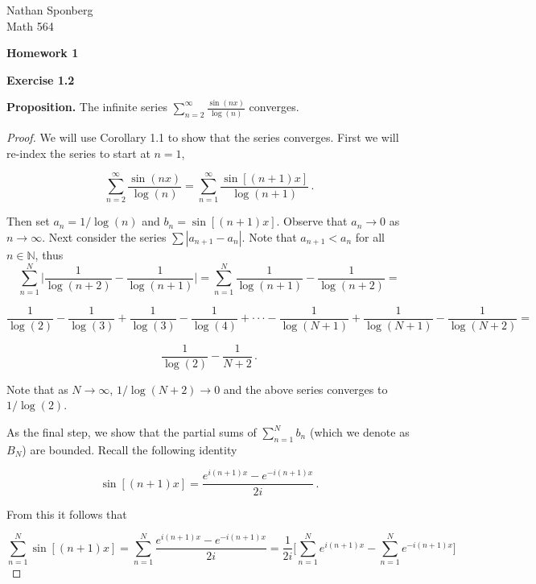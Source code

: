 \documentclass[a4paper]{article}
\newcommand {\m} {\cdot}
\newcommand {\pro} {\textbf{Proposition. }}
\numberwithin{equation}{section}
\begin{document}
\begin{flushright}
{\small{Nathan Sponberg\\}}
{\small{Math 564}}
\end{flushright}

\begin{center}
\bf{Homework 1}
\end{center}

\begin{description}

\item \textbf{Exercise 1.2}

	\begin{description}
	
	\item\pro The infinite series $\sum \limits_{n=2}^\infty \frac{\sin(nx)}{\log(n)}$	converges.
	
	\begin{proof} We will use Corollary 1.1 to show that the series converges. First we will re-index the series to start at $n=1$,

	$$\sum \limits_{n=2}^\infty \frac{\sin(nx)}{\log(n)} = \sum \limits_{n=1}^\infty \frac{\sin[(n+1)x]}{\log(n+1)}\,.$$
	
	 Then set $a_n = 1/\log(n)$ and $b_n = \sin[(n+1)x]$. Observe that $a_n \rightarrow 0$ as $n \rightarrow \infty$. Next consider the series $\sum |a_{n+1} - a_n|$. Note that $a_{n+1} < a_n$ for all $n \in \mathbb{N}$, thus 
	 $$\sum_{n=1}^N \Big|\frac{1}{\log(n+2)} - \frac{1}{\log(n+1)} \Big| = \sum_{n=1}^N\frac{1}{\log(n+1)} - \frac{1}{\log(n+2)} =$$
	 
	 $$ \frac{1}{\log(2)} - \frac{1}{\log(3)} + \frac{1}{\log(3)} - \frac{1}{\log(4)} + \m\m\m - \frac{1}{\log(N+1)} + \frac{1}{\log(N+1)} - \frac{1}{\log(N+2)} = $$
	 
	 $$\frac{1}{\log(2)} - \frac{1}{N+2}\,.$$
	 
	 Note that as $N \rightarrow \infty$, $1/\log(N+2) \rightarrow 0$ and the above series converges to $1/\log(2)$.
	 
	 As the final step, we show that the partial sums of $\sum_{n = 1}^N b_n$ (which we denote as $B_N$) are bounded. Recall the following identity
	 
	 $$\sin[(n+1)x] = \frac{e^{i(n+1)x}-e^{-i(n+1)x}}{2i}\,.$$

	From this it follows that
	
	$$\sum_{n = 1}^N \sin[(n+1)x] = \sum_{n = 1}^N \frac{e^{i(n+1)x}-e^{-i(n+1)x}}{2i} = \frac{1}{2i}\Big[\sum_{n = 1}^N e^{i(n+1)x}- \sum_{n = 1}^N e^{-i(n+1)x}\Big]$$
	

\end{proof}
\end{description}
\end{description}
\end{document}
